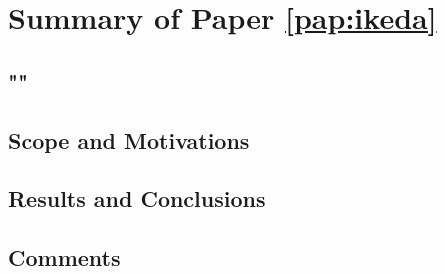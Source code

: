 \section{Summary of Paper \ref{pap:ikeda}}
\subsection*{""}
\subsection*{Scope and Motivations}
\subsection*{Results and Conclusions}
\subsection*{Comments}
\clearpage